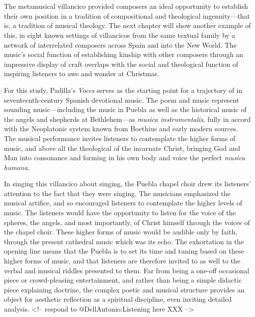 \section{}

The metamusical villancico provided composers an ideal opportunity to establish
their own position in a tradition of compositional and theological
ingenuity---that is, a tradition of musical theology.
The next chapter will show another example of this, in eight known settings of
villancicos from the same textual family by a network of interrelated composers
across Spain and into the New World.
The music's social function of establishing kinship with other composers through
an impressive display of craft overlaps with the social and theological function
of inspiring listeners to awe and wonder at Christmas.

For this study, Padilla's \emph{Voces} serves as the starting point for a trajectory
of  in seventeenth-century Spanish devotional music.
The poem and music represent sounding music---including the  music in
Puebla as well as the historical music of the angels and shepherds at
Bethlehem---as \emph{musica instrumentalis}, fully in accord with the Neoplatonic
system known from Boethius and early modern sources.
The musical performance invites listeners to contemplate the higher forms of
music, and above all the theological  of the incarnate Christ, bringing
God and Man into consonance and forming in his own body and voice the perfect
\emph{musica humana}.

In singing this villancico about singing, the Puebla chapel choir drew its
listeners' attention to the fact that they were singing.
The musicians emphasized the musical artifice, and so encouraged listeners to
contemplate the higher levels of music.
The listeners would have the opportunity to listen for the voice of the spheres,
the angels, and most importantly, of Christ himself through the voices of the
chapel choir.
These higher forms of music would be audible only by faith, through the present
cathedral music which was its echo.
The exhortation in the opening line means that the Puebla  is to
set its time and tuning based on these higher forms of music, and that listeners
are therefore invited to  as well to the verbal and musical
riddles presented to them.
Far from being a one-off occasional piece or crowd-pleasing entertainment, and
rather than being a simple didactic piece explaining doctrine, the complex
poetic and musical structure provides an object for aesthetic reflection as a
spiritual discipline, even inviting detailed analysis.
<!-- respond to @DellAntonio:Listening here XXX -->

